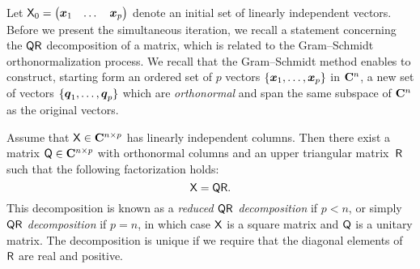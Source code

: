 Let $\mathsf X_0 = \begin{pmatrix} \mathbf{\boldsymbol{x}}_1 & \dotsc & \mathbf{\boldsymbol{x}}_p \end{pmatrix}$ denote an initial set of linearly independent vectors.
Before we present the simultaneous iteration,
we recall a statement concerning the $\mathsf Q \mathsf R$ decomposition of a matrix,
which is related to the Gram--Schmidt orthonormalization process.
We recall that the Gram--Schmidt method enables to construct,
starting form an ordered set of $p$ vectors $\{\mathbf{\boldsymbol{x}}_1, \dotsc, \mathbf{\boldsymbol{x}}_p \}$ in $\mathbf C^n$,
a new set of vectors $\{\mathbf{\boldsymbol{q}}_1, \dotsc, \mathbf{\boldsymbol{q}}_p \}$
which are \emph{orthonormal} and span the same subspace of $\mathbf C^n$ as the original vectors.
\begin{proposition}
    Assume that $\mathsf X \in \mathbf C^{n \times p}$ has linearly independent columns.
    Then there exist a matrix $\mathsf Q \in \mathbf C^{n \times p}$ with orthonormal columns and
    an upper triangular matrix~$\mathsf R$ such that the following factorization holds:
    \[
        \mathsf X = \mathsf Q \mathsf R.
    \]
    This decomposition is known as a \emph{reduced $\mathsf Q \mathsf R$ decomposition} if $p < n$,
    or simply \emph{$\mathsf Q \mathsf R$ decomposition} if $p = n$,
    in which case $\mathsf X$ is a square matrix and $\mathsf Q$ is a unitary matrix.
    The decomposition is unique if we require that the diagonal elements of~$\mathsf R$ are real and positive.
\end{proposition}
